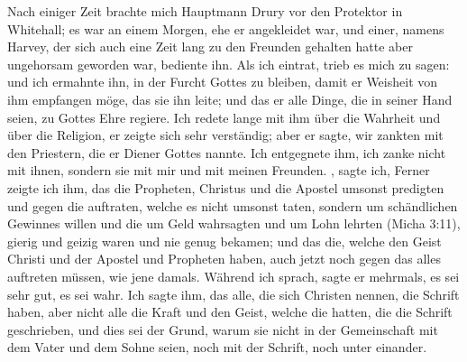 Nach einiger Zeit brachte mich Hauptmann 
Drury vor den
Protektor in Whitehall; es war an einem 
Morgen, ehe er angekleidet war, und einer, namens Harvey, 
der sich auch eine Zeit lang zu den Freunden gehalten hatte 
aber ungehorsam geworden war, bediente ihn. Als ich eintrat, 
trieb es mich zu sagen:  
und ich ermahnte ihn, in der Furcht
Gottes zu bleiben, damit er Weisheit von ihm empfangen möge,
das sie ihn leite; und das er alle Dinge, die in seiner Hand
seien, zu Gottes Ehre regiere. Ich redete lange mit ihm über
die Wahrheit und über die Religion, er 
zeigte sich sehr verständig;
aber er sagte, wir zankten mit den Priestern, die er Diener Gottes
nannte. Ich entgegnete ihm, ich zanke nicht mit ihnen, sondern
sie mit mir und mit meinen Freunden. , sagte 
ich, 
Ferner zeigte ich ihm, das die Propheten, Christus und die
Apostel umsonst predigten und gegen die auftraten, welche es
nicht umsonst taten, sondern um schändlichen Gewinnes willen
und die um Geld wahrsagten und um Lohn lehrten 
(Micha 3:11),
gierig und geizig waren und nie genug bekamen; und das die,
welche den Geist Christi und der Apostel und Propheten haben,
auch jetzt noch gegen das alles auftreten müssen, wie jene damals.
Während ich sprach, sagte er mehrmals, es sei sehr gut, es sei
wahr. Ich sagte ihm, das alle, die sich Christen nennen, die
Schrift haben, aber nicht alle die Kraft und 
den Geist, welche
die hatten, die die Schrift geschrieben, und dies sei der Grund,
warum sie nicht in der Gemeinschaft mit dem Vater und dem
Sohne seien, noch mit der Schrift, noch unter einander. 


